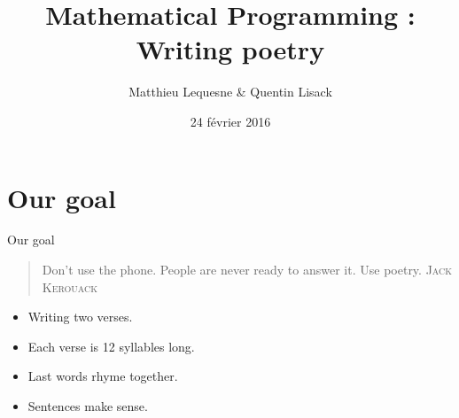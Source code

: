 \documentclass[unknownkeysallowed]{beamer}
\title{Mathematical Programming : \\Writing poetry}	%
\author{Matthieu Lequesne \& Quentin Lisack}						%
\institute{École polytechnique}					%
\date[]{24 février 2016}
\begin{document}
{
\frame[plain]{\titlepage}
}







\section{Our goal}

\begin{frame}{Our goal}


\begin{quote}
\og Don’t use the phone. People are never ready to answer it. Use poetry. \fg
\flushright \textsc{Jack Kerouack}
\end{quote}

\begin{itemize}
\item Writing two verses.
\item Each verse is 12 syllables long.
\item Last words rhyme together.
\item Sentences make sense.
\end{itemize}
\end{frame}
\end{document}
